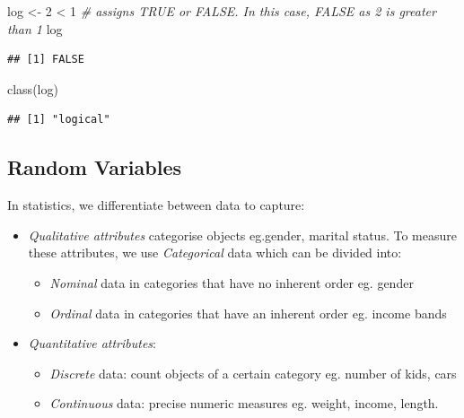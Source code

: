\documentclass[
]{book}
\newenvironment{Shaded}{\begin{snugshade}}{\end{snugshade}}
\newcommand{\CommentTok}[1]{\textcolor[rgb]{0.56,0.35,0.01}{\textit{#1}}}
\newcommand{\DecValTok}[1]{\textcolor[rgb]{0.00,0.00,0.81}{#1}}
\newcommand{\FunctionTok}[1]{\textcolor[rgb]{0.00,0.00,0.00}{#1}}
\newcommand{\NormalTok}[1]{#1}
\newcommand{\OtherTok}[1]{\textcolor[rgb]{0.56,0.35,0.01}{#1}}
\newcommand{\SpecialCharTok}[1]{\textcolor[rgb]{0.00,0.00,0.00}{#1}}
\providecommand{\tightlist}{%
  \setlength{\itemsep}{0pt}\setlength{\parskip}{0pt}}
\begin{document}
\begin{Shaded}
\begin{Highlighting}[]
\NormalTok{log }\OtherTok{\textless{}{-}} \DecValTok{2} \SpecialCharTok{\textless{}} \DecValTok{1} \CommentTok{\# assigns TRUE or FALSE. In this case, FALSE as 2 is greater than 1}
\NormalTok{log}
\end{Highlighting}
\end{Shaded}

\begin{verbatim}
## [1] FALSE
\end{verbatim}

\begin{Shaded}
\begin{Highlighting}[]
\FunctionTok{class}\NormalTok{(log)}
\end{Highlighting}
\end{Shaded}

\begin{verbatim}
## [1] "logical"
\end{verbatim}

\hypertarget{random-variables}{%
\subsection{Random Variables}\label{random-variables}}

In statistics, we differentiate between data to capture:

\begin{itemize}
\item
  \emph{Qualitative attributes} categorise objects eg.gender, marital status. To measure these attributes, we use \emph{Categorical} data which can be divided into:

  \begin{itemize}
  \tightlist
  \item
    \emph{Nominal} data in categories that have no inherent order eg. gender
  \item
    \emph{Ordinal} data in categories that have an inherent order eg. income bands
  \end{itemize}
\item
  \emph{Quantitative attributes}:

  \begin{itemize}
  \tightlist
  \item
    \emph{Discrete} data: count objects of a certain category eg. number of kids, cars
  \item
    \emph{Continuous} data: precise numeric measures eg. weight, income, length.
  \end{itemize}
\end{itemize}
\end{document}

